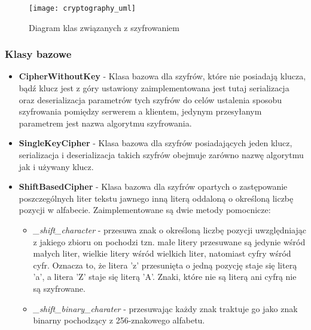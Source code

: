 \documentclass{article}
\begin{document}
    \begin{figure}[H]
        \centering
        \texttt{[image: cryptography\_uml]}
        \caption{Diagram klas związanych z szyfrowaniem}
        \label{CRYPTOGRAPHY_UML}
    \end{figure}

    \subsubsection{Klasy bazowe}

      \begin{itemize}
          \item {\bfseries CipherWithoutKey} - Klasa bazowa dla szyfrów, które nie posiadają klucza, bądź klucz jest
              z góry ustawiony zaimplementowana jest tutaj serializacja oraz deserializacja parametrów tych szyfrów do
              celów ustalenia sposobu szyfrowania pomiędzy serwerem a klientem, jedynym przesyłanym parametrem jest
              nazwa algorytmu szyfrowania.
          \item {\bfseries SingleKeyCipher} - Klasa bazowa dla szyfrów posiadających jeden klucz, serializacja i
              deserializacja takich szyfrów obejmuje zarówno nazwę algorytmu jak i używany klucz.
          \item {\bfseries ShiftBasedCipher} - Klasa bazowa dla szyfrów opartych o zastępowanie poszczególnych liter
              tekstu jawnego inną literą oddaloną o określoną liczbę pozycji w alfabecie. Zaimplementowane są dwie
              metody pomocnicze:
              \begin{itemize}
                  \item \emph{\_shift\_character} - przesuwa znak o określoną liczbę pozycji uwzględniając z jakiego
                      zbioru on pochodzi tzn. małe litery przesuwane są jedynie wśród małych liter, wielkie litery wśród
                      wielkich liter, natomiast cyfry wśród cyfr. Oznacza to, że litera 'z' przesunięta o jedną pozycję
                      staje się literą 'a', a litera 'Z' staje się literą 'A'. Znaki, które nie są literą ani cyfrą nie
                      są szyfrowane.
                   \item \emph{\_shift\_binary\_charater} - przesuwając każdy znak traktuje go jako znak binarny
                       pochodzący z 256-znakowego alfabetu.
              \end{itemize}
      \end{itemize}
\end{document}
